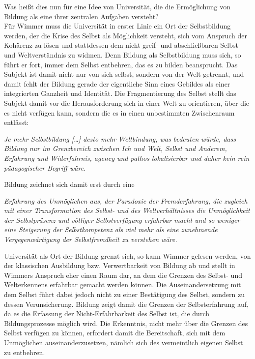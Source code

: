 \noindent Was heißt dies nun für eine Idee von Universität,
die die Ermöglichung von Bildung als eine ihrer zentralen Aufgaben versteht?\\

Für Wimmer muss die Universität in erster Linie ein Ort der Selbstbildung
werden, der die Krise des Selbst als Möglichkeit versteht, sich vom Anspruch
der Kohärenz zu lösen und stattdessen dem nicht greif- und abschließbaren
Selbst- und Weltverständnis zu widmen.  Denn Bildung als Selbstbildung muss
sich, so führt er fort, immer dem Selbst entbehren, das es zu bilden
beansprucht. Das Subjekt ist damit nicht nur von sich selbst, sondern von der
Welt getrennt, und damit fehlt der Bildung \glqq gerade der eigentliche Sinn eines
Gebildes als einer integrierten Ganzheit und Identität.\grqq\footnotemark {}  Die Fragmentierung
des Selbst stellt das Subjekt damit vor die Herausforderung sich in einer Welt
zu orientieren, über die es nicht verfügen kann, sondern die es in einen
unbestimmten Zwischenraum entlässt: 
\begin{myenv}
  \textit{ \glqq Je mehr Selbstbildung […] desto mehr
Weltbindung, was bedeuten würde, dass Bildung nur im Grenzbereich zwischen Ich
und Welt, Selbst und Anderem, Erfahrung und Widerfahrnis, agency und pathos
lokalisierbar und daher kein rein pädagogischer Begriff wäre.\grqq}
\footnotemark {}  
\end{myenv}
Bildung
zeichnet sich damit erst durch eine 
\begin{myenv}
  \textit{\glqq [...]Erfahrung des Unmöglichen aus, der
Paradoxie der Fremderfahrung, die zugleich mit einer Transformation des Selbst-
und des Weltverhältnisses die Unmöglichkeit der Selbstpräsenz und völliger
Selbstverfügung erfahrbar macht und so weniger eine Steigerung der
Selbstkompetenz als viel mehr als eine zunehmende Vergegenwärtigung der
Selbstfremdheit zu verstehen wäre.\grqq}
\footnotemark {}  
\end{myenv}
Universität als Ort der Bildung grenzt sich, so kann Wimmer gelesen werden, von
der klassischen Ausbildung bzw. Verwertbarkeit von Bildung ab und stellt in
Wimmers Anspruch eher einen Raum dar, an dem die Grenzen des Selbst- und
Welterkennens erfahrbar gemacht werden können. Die Auseinandersetzung mit dem
Selbst führt dabei jedoch nicht zu einer Bestätigung des Selbst, sondern zu
dessen Verunsicherung. Bildung zeigt damit die Grenzen der Selbsterfahrung auf,
da es die Erfassung der Nicht-Erfahrbarkeit des Selbst ist, die durch
Bildungsprozesse möglich wird. Die Erkenntnis, nicht mehr über die Grenzen des
Selbst verfügen zu können, erfordert damit die Bereitschaft, sich mit dem
Unmöglichen auseinanderzusetzen, nämlich sich des vermeintlich eigenen Selbst
zu entbehren.\\  

